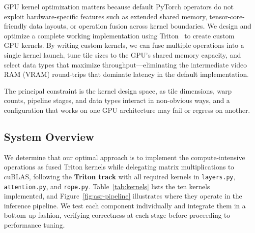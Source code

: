 \documentclass{article}
\begin{document}
GPU kernel optimization matters because default PyTorch operators do not exploit hardware-specific features such as extended shared memory, tensor-core-friendly data layouts, or operation fusion across kernel boundaries.
We design and optimize a complete working implementation using Triton~\citep{tillet2019triton} to create custom GPU kernels.
By writing custom kernels, we can fuse multiple operations into a single kernel launch, tune tile sizes to the GPU's shared memory capacity, and select data types that maximize throughput---eliminating the intermediate video RAM (VRAM) round-trips that dominate latency in the default implementation.

The principal constraint is the kernel design space, as tile dimensions, warp counts, pipeline stages, and data types interact in non-obvious ways, and a configuration that works on one GPU architecture may fail or regress on another.

\subsection{System Overview}

We determine that our optimal approach is to implement the compute-intensive operations as fused Triton kernels while delegating matrix multiplications to cuBLAS, following the \textbf{Triton track} with all required kernels in \texttt{layers.py}, \texttt{attention.py}, and \texttt{rope.py}.
Table~\ref{tab:kernels} lists the ten kernels implemented, and Figure~\ref{fig:asr-pipeline} illustrates where they operate in the inference pipeline.
We test each component individually and integrate them in a bottom-up fashion, verifying correctness at each stage before proceeding to performance tuning.
\end{document}
